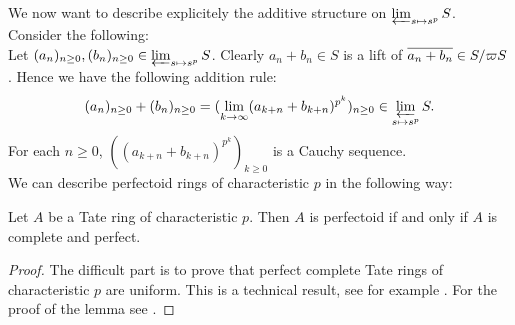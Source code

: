 We now want to describe explicitely the additive structure on $\varprojlim_{s\mapsto s^p}S$. Consider the following:\\

Let $(a_n)_{n\geq0}, (b_n)_{n\geq0}\in\varprojlim_{s\mapsto s^p}S$. Clearly $a_n+b_n\in S$ is a lift of $\overline{a_n+b_n}\in S/\varpi S$.
Hence we have the following addition rule:
\[(a_n)_{n\geq0}+(b_n)_{n\geq0} = (\lim_{k\to\infty}(a_{k+n}+b_{k+n})^{p^k})_{n\geq0}\in\varprojlim_{s\mapsto s^p}S.\]
For each ${n\geq0}$, $((a_{k+n}+b_{k+n})^{p^k})_{k\geq0}$ is a Cauchy sequence.\\


We can describe perfectoid rings of characteristic $p$ in the following way:
\begin{lemma}\label{perfringplemma}
Let $A$ be a Tate ring of characteristic $p$. Then $A$ is perfectoid if and only if $A$ is complete and perfect.
\end{lemma}
\begin{proof}
The difficult part is to prove that perfect complete Tate rings of characteristic $p$ are uniform.
This is a technical result, see for example \cite[theorem IV.1.3.5]{Morel19}.
For the proof of the lemma see \cite[proposition V.1.1.8]{Morel19}.
\end{proof}










